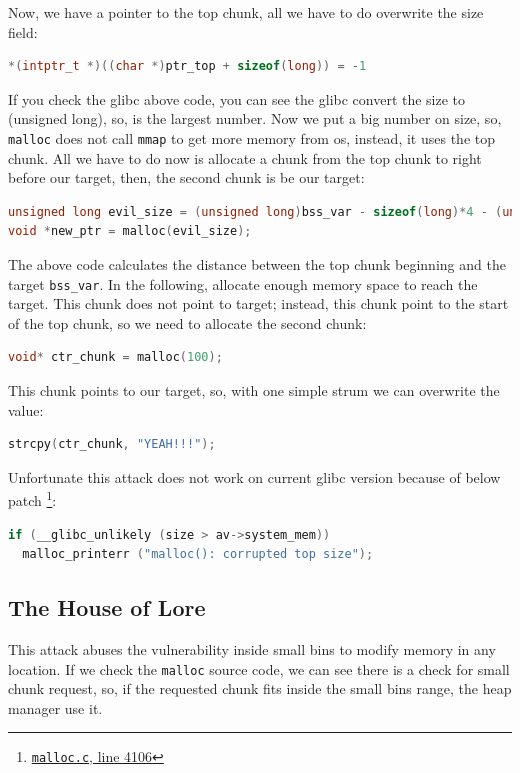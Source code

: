 \documentclass{masterthesis}
\newcommand*\libc{glibc}
\newcommand*\sbs{small bins}
\newcommand*\mallocc{\lstinline{malloc}\xspace}
\newcommand*\mmapc{\lstinline{mmap}\xspace}
\begin{document}
Now, we have a pointer to the top chunk, all we have to do overwrite the size field:

\begin{lstlisting}[language=c,frame=tlrb]
*(intptr_t *)((char *)ptr_top + sizeof(long)) = -1
\end{lstlisting}

If you check the \libc{} above code, you can see the \libc{} convert the size to (unsigned long), so,  is the largest number. Now we put a big number on size, so, \mallocc{} does not call \mmapc{} to get more memory from os, instead, it uses the top chunk. All we have to do now is allocate a chunk from the top chunk to right before our target, then, the second chunk is be our target:

\begin{lstlisting}[language=c,frame=tlrb]
unsigned long evil_size = (unsigned long)bss_var - sizeof(long)*4 - (unsigned long)ptr_top;
void *new_ptr = malloc(evil_size);
\end{lstlisting}

The above code calculates the distance between the top chunk beginning and the target \lstinline{bss_var}. In the following, allocate enough memory space to reach the target. This chunk does not point to target; instead, this chunk point to the start of the top chunk, so we need to allocate the second chunk:

\begin{lstlisting}[language=c,frame=tlrb]
void* ctr_chunk = malloc(100);
\end{lstlisting}

This chunk points to our target, so, with one simple strum we can overwrite the value:

\begin{lstlisting}[language=c,frame=tlrb]
strcpy(ctr_chunk, "YEAH!!!");
\end{lstlisting}

Unfortunate this attack does not work on current \libc{} version because of below patch \footnote{\href{https://sourceware.org/git/?p=glibc.git;a=blob;f=malloc/malloc.c;h=f7cd29bc2f93e1082ee77800bd64a4b2a2897055;hb=9ea3686266dca3f004ba874745a4087a89682617\#l4106}{\texttt{malloc.c}, line 4106}}:
\begin{lstlisting}[language=c,frame=tlrb]
if (__glibc_unlikely (size > av->system_mem))
  malloc_printerr ("malloc(): corrupted top size");
\end{lstlisting}

\subsection{The House of Lore}
\label{subsect:houselore}
This attack abuses the vulnerability inside \sbs{} to modify memory in any location. If we check the \mallocc{} source code, we can see there is a check for small chunk request, so, if the requested chunk fits inside the \sbs{} range, the heap manager use it.
\end{document}
